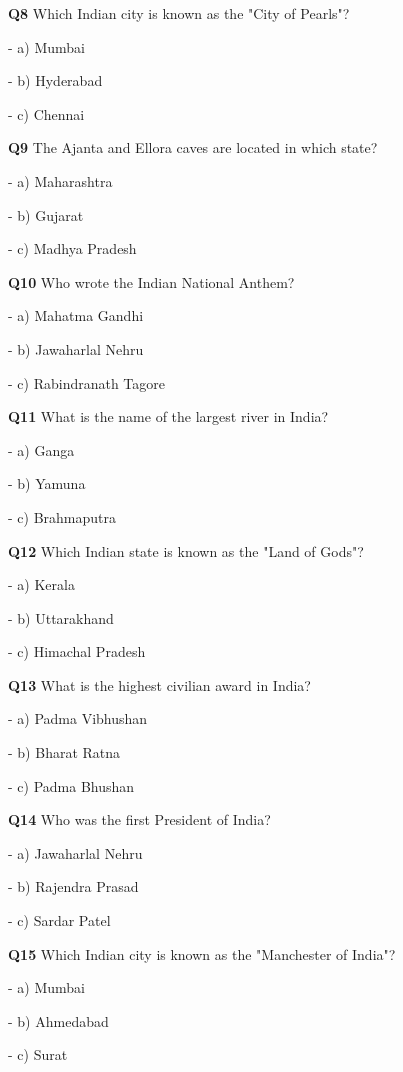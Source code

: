 \textbf{Q8} Which Indian city is known as the "City of Pearls"?\par
\quad - a) Mumbai\par
\quad - b) Hyderabad\par
\quad - c) Chennai\par

\textbf{Q9} The Ajanta and Ellora caves are located in which state?\par
\quad - a) Maharashtra\par
\quad - b) Gujarat\par
\quad - c) Madhya Pradesh\par

\textbf{Q10} Who wrote the Indian National Anthem?\par
\quad - a) Mahatma Gandhi\par
\quad - b) Jawaharlal Nehru\par
\quad - c) Rabindranath Tagore\par

\textbf{Q11} What is the name of the largest river in India?\par
\quad - a) Ganga\par
\quad - b) Yamuna\par
\quad - c) Brahmaputra\par

\textbf{Q12} Which Indian state is known as the "Land of Gods"?\par
\quad - a) Kerala\par
\quad - b) Uttarakhand\par
\quad - c) Himachal Pradesh\par

\textbf{Q13} What is the highest civilian award in India?\par
\quad - a) Padma Vibhushan\par
\quad - b) Bharat Ratna\par
\quad - c) Padma Bhushan\par

\textbf{Q14} Who was the first President of India?\par
\quad - a) Jawaharlal Nehru\par
\quad - b) Rajendra Prasad\par
\quad - c) Sardar Patel\par

\textbf{Q15} Which Indian city is known as the "Manchester of India"?\par
\quad - a) Mumbai\par
\quad - b) Ahmedabad\par
\quad - c) Surat\par

